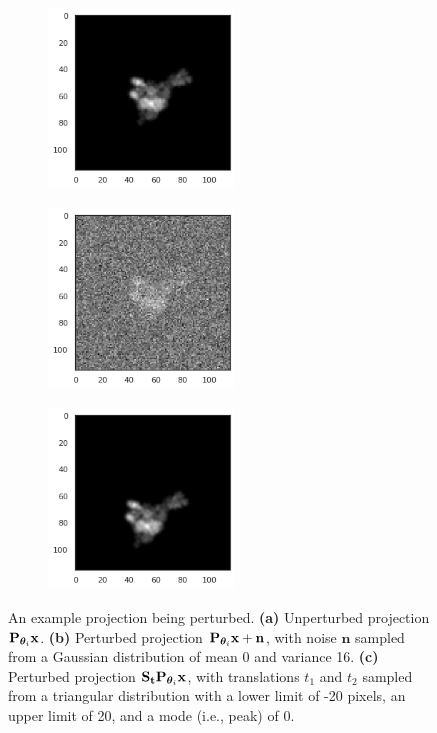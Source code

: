 \begin{figure}[ht!]
    \centering
    \begin{subfigure}[b]{0.3\textwidth}
        \includegraphics[height=4.8cm]{figures/5j0n_noise0}
        \caption{}
    \end{subfigure}
    \hfill
    \begin{subfigure}[b]{0.3\textwidth}
    \centering
        \includegraphics[height=4.8cm]{figures/5j0n_noise16}
        \caption{}
    \end{subfigure}
    \hfill
    \begin{subfigure}[b]{0.3\textwidth}
    \centering
        \includegraphics[height=4.8cm]{figures/5j0n_translated}
        \caption{}
    \end{subfigure}
    \caption{%
        An example projection being perturbed.
        \textbf{(a)} Unperturbed projection $\mathbf{P}_{{\boldsymbol{\theta}}_i} \mathbf{x}$.
        \textbf{(b)} Perturbed projection $\mathbf{P}_{{\boldsymbol{\theta}}_i} \mathbf{x} + \mathbf{n}$, with noise $\mathbf{n}$ sampled from a Gaussian distribution of mean 0 and variance 16.
        \textbf{(c)} Perturbed projection $\mathbf{S}_{\mathbf{t}} \mathbf{P}_{{\boldsymbol{\theta}}_i} \mathbf{x}$, with translations $t_1$ and $t_2$ sampled from a triangular distribution with a lower limit of -20 pixels, an upper limit of 20, and a mode (i.e., peak) of 0.
    }\label{fig:different-projections}
\end{figure}

